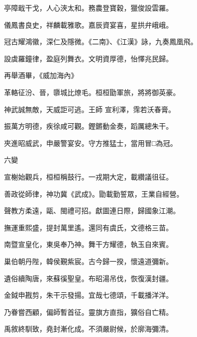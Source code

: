 \begin{pinyinscope}
 亭障戢干戈，人心浹太和。務農登寶穀，獵俊設雲羅。



 儀鳳書良史，祥麟載雅歌。嘉辰資宴喜，星拱弁峨峨。



 冠古耀鴻徽，深仁及隱微。《二南》、《江漢》詠，九奏鳳凰飛。



 設虡羅鐘律，盈庭列舞衣。文明資厚德，怡懌兆民歸。



 再舉酒畢，《威加海內》



 革輅征汾、晉，隳城比燎毛。桓桓勖軍旅，將將御英豪。



 神武誠無敵，天威詎可逃。王師
 宣利澤，霈若沃春膏。



 振萬方明德，疾徐咸可觀。鏗鏘動金奏，蹈厲總朱干。



 夾進昭威武，申嚴警宴安。守方推猛士，當用冒□為冠。



 六變



 宣榭始觀兵，桓桓稱鼓行。一戎期大定，載纘議徂征。



 善政從師律，神功冀《武成》。勖載勤誓眾，王業自經營。



 聲教方柔遠，甌、閩禮可招。獻圖連日際，歸國象江潮。



 撫運重熙盛，提封萬里遙。還同有虞氏，文德格三苗。



 南暨宣皇化，東吳奉乃神。舞干方耀德，執玉自來賓。



 巢伯朝丹陛，韓侯覲紫宸。古今歸一揆，懷遠道彌新。



 遺俗續陶唐，來蘇徯聖皇。布昭湯吊伐，恢復漢封疆。



 金鉞申戡剪，朱干示發揚。宜哉七德頌，千載播洋洋。



 乃眷嘗西顧，偏師暫首征。靈旗方直指，獷俗自亡精。



 禹敘終馴致，堯封漸化成。不須嚴尉候，於廓海彌清。




\end{pinyinscope}
